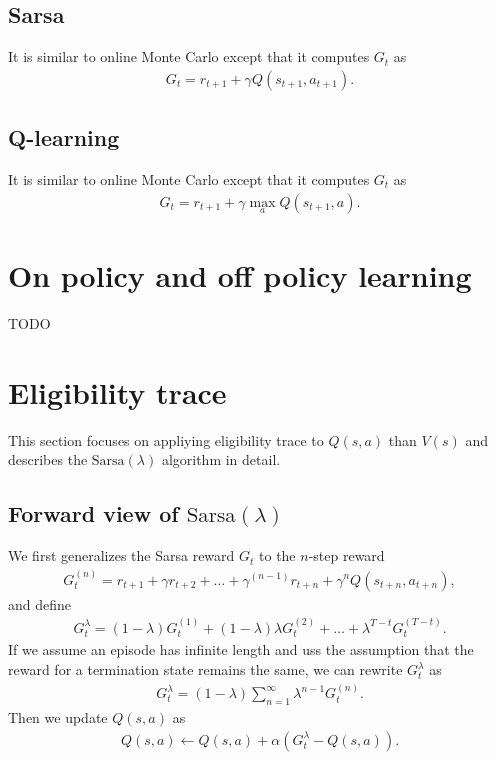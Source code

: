 \documentclass[onecolumn, 12pt]{IEEEtran}
\newcommand\1[1]{\mathbb{I}_{\left\{#1\right\}}}
\begin{document}
\subsection{Sarsa}
It is similar to online Monte Carlo except that it computes $G_t$ as
\begin{align*}
  G_t = r_{t+1}+\gamma Q(s_{t+1}, a_{t+1}).
\end{align*}

\subsection{Q-learning}
It is similar to online Monte Carlo except that it computes $G_t$ as
\begin{align*}
  G_t = r_{t+1}+\gamma \max_a Q(s_{t+1}, a).
\end{align*}

\section{On policy and off policy learning}
TODO


\section{Eligibility trace}

This section focuses on appliying eligibility trace to $Q(s, a)$ than $V(s)$ and describes the $\text{Sarsa}(\lambda)$ algorithm in detail.

\subsection{Forward view of $\text{Sarsa}(\lambda)$}

We first generalizes the Sarsa reward $G_t$ to the $n$-step reward
\begin{align*}
  G_t^{(n)} = r_{t + 1} + \gamma r_{t + 2} + \dots + \gamma^{(n - 1)}r_{t +n} + \gamma^nQ(s_{t + n}, a_{t + n}), 
\end{align*}
and define
\begin{align*}
  G_t^\lambda = (1-\lambda)G_t^{(1)} + (1-\lambda)\lambda G_t^{(2)} + \dots + \lambda^{T - t} G_t^{(T - t)}. 
\end{align*}
If we assume an episode has infinite length and uss the assumption that the reward for a termination state remains the same, we can rewrite $G_t^\lambda$ as
\begin{align*}
  G_t^\lambda = (1 - \lambda) \sum_{n = 1}^\infty \lambda^{n - 1}G_t^{(n)}. 
\end{align*}
Then we update $Q(s, a)$ as
\begin{align*}
  Q(s, a) \leftarrow Q(s, a) + \alpha(G_t^\lambda - Q(s, a)). 
\end{align*}
\end{document}
